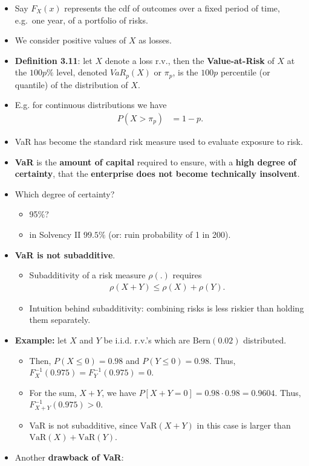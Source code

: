 \documentclass[]{book}
\begin{document}
\begin{itemize}
\item
  Say \(F_X(x)\) represents the cdf of outcomes over a fixed period of
  time, e.g.~one year, of a portfolio of risks.
\item
  We consider positive values of \(X\) as losses.
\item
  \textbf{Definition 3.11}: let \(X\) denote a loss r.v., then the
  \textbf{Value-at-Risk} of \(X\) at the \(100p\%\) level, denoted
  \(VaR_p(X)\) or \(\pi_p\), is the \(100p\) percentile (or quantile) of
  the distribution of \(X\).
\item
  E.g. for continuous distributions we have \[\begin{aligned}
  P(X> \pi_p) &= 1-p.\end{aligned}\]
\item
  VaR has become the standard risk measure used to evaluate exposure to
  risk.
\item
  \textbf{VaR} is the \textbf{amount of capital} required to ensure,
  with a \textbf{high degree of certainty}, that the \textbf{enterprise
  does not become technically insolvent}.
\item
  Which degree of certainty?

  \begin{itemize}
  \item
    95\(\%\)?
  \item
    in Solvency II \(99.5\%\) (or: ruin probability of 1 in 200).
  \end{itemize}
\item
  \textbf{VaR is not subadditive}.

  \begin{itemize}
  \item
    Subadditivity of a risk measure \(\rho(.)\) requires
    \[\begin{aligned}
    \rho(X+Y) \leq \rho(X)+\rho(Y).\end{aligned}\]
  \item
    Intuition behind subadditivity: combining risks is less riskier than
    holding them separately.
  \end{itemize}
\item
  \textbf{Example:} let \(X\) and \(Y\) be i.i.d. r.v.'s which are
  \(\text{Bern}(0.02)\) distributed.

  \begin{itemize}
  \item
    Then, \(P(X\leq 0) = 0.98\) and \(P(Y\leq 0)=0.98\). Thus,
    \(F_X^{-1}(0.975)=F_Y^{-1}(0.975)=0\).
  \item
    For the sum, \(X+Y\), we have \(P[X+Y=0]=0.98 \cdot 0.98=0.9604\).
    Thus, \(F_{X+Y}^{-1}(0.975)>0\).
  \item
    VaR is not subadditive, since \(\text{VaR}(X+Y)\) in this case is
    larger than \(\text{VaR}(X)+\text{VaR}(Y)\).
  \end{itemize}
\item
  Another \textbf{drawback of VaR}:


\end{itemize}
\end{document}
